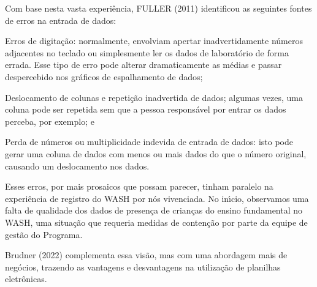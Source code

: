 \documentclass[
12pt,		%
openright,	%
twoside,  %
a4paper,			%
chapter=TITLE,		%
english,			%
french,				%
spanish,			%
brazil				%
]{USPSC-classe/USPSC}
\begin{document}
Com base nesta vasta experi\^encia,  FULLER (2011) identificou as seguintes fontes de erros na entrada de dados:


















\begin{alineas}
\item Erros de digita\c{c}\~ao: normalmente, envolviam apertar inadvertidamente n\'umeros adjacentes no teclado ou simplesmente ler os dados de laborat\'orio de forma errada. Esse tipo de erro pode alterar dramaticamente as m\'edias e passar despercebido nos gr\'aficos de espalhamento de dados;
\item Deslocamento de colunas e repeti\c{c}\~ao inadvertida de dados; algumas vezes, uma coluna pode ser repetida sem que a pessoa respons\'avel por entrar os dados perceba, por exemplo; e
\item Perda de n\'umeros ou multiplicidade indevida de entrada de dados: isto pode gerar uma coluna de dados com menos ou mais dados do que o n\'umero original, causando um deslocamento nos dados.
\end{alineas}

Esses erros, por mais prosaicos que possam parecer, tinham paralelo na experi\^encia de registro do WASH por n\'os vivenciada. No in\'{\i}cio, observamos uma falta de qualidade dos dados de presen\c{c}a de crian\c{c}as do ensino fundamental no WASH, uma situa\c{c}\~ao que requeria medidas de conten\c{c}\~ao por parte da equipe de gest\~ao do Programa.

















 Brudner (2022) complementa essa vis\~ao, mas com uma abordagem mais de neg\'ocios, trazendo as vantagens e desvantagens na utiliza\c{c}\~ao de planilhas eletr\^onicas.
\end{document}
